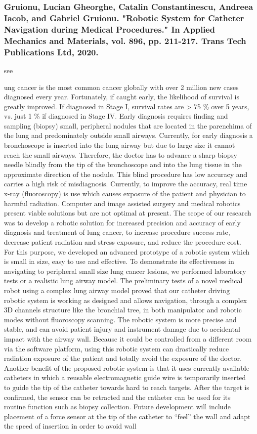 \documentclass[conference]{IEEEtran}
\begin{document}
\medskip
\subsubsection{Gruionu, Lucian Gheorghe, Catalin Constantinescu, Andreea Iacob, and Gabriel Gruionu. "Robotic System for Catheter Navigation during Medical Procedures." In Applied Mechanics and Materials, vol. 896, pp. 211-217. Trans Tech Publications Ltd, 2020.}
see \cite{gruionu2020robotic}

ung cancer is the most common cancer globally with over 2 million new cases diagnosed every year. Fortunately, if caught early, the likelihood of survival is greatly improved. If diagnosed in Stage I, survival rates are > 75 \% over 5 years, vs. just 1 \%  if diagnosed in Stage IV. Early diagnosis requires finding and sampling (biopsy) small, peripheral nodules that are located in the parenchima of the lung and predominately outside small airways. Currently, for early diagnosis a bronchoscope is inserted into the lung airway but due to large size it cannot reach the small airways. Therefore, the doctor has to advance a sharp biopsy needle blindly from the tip of the bronchoscope and into the lung tissue in the approximate direction of the nodule. This blind procedure has low accuracy and carries a high risk of misdiagnosis. Currently, to improve the accuracy, real time x-ray (fluoroscopy) is use which causes exposure of the patient and physician to harmful radiation. Computer and image assisted surgery and medical robotics present viable solutions but are not optimal at present. The scope of our research was to develop a robotic solution for increased precision and accuracy of early diagnosis and treatment of lung cancer, to increase procedure success rate, decrease patient radiation and stress exposure, and reduce the procedure cost. For this purpose, we developed an advanced prototype of a robotic system which is small in size, easy to use and effective. To demonstrate its effectiveness in navigating to peripheral small size lung cancer lesions, we performed laboratory tests or a realistic lung airway model. The preliminary tests of a novel medical robot using a complex lung airway model proved that our catheter driving robotic system is working as designed and allows navigation, through a complex 3D channels structure like the bronchial tree, in both manipulator and robotic modes without fluoroscopy scanning. The robotic system is more precise and stable, and can avoid patient injury and instrument damage due to accidental impact with the airway wall. Because it could be controlled from a different room via the software platform, using this robotic system can drastically reduce radiation exposure of the patient and totally avoid the exposure of the doctor. Another benefit of the proposed robotic system is that it uses currently available catheters in which a reusable electromagnetic guide wire is temporarily inserted to guide the tip of the catheter towards hard to reach targets. After the target is confirmed, the sensor can be retracted and the catheter can be used for its routine function such as biopsy collection. Future development will include placement of a force sensor at the tip of the catheter to “feel” the wall and adapt the speed of insertion in order to avoid wall 
\end{document}
